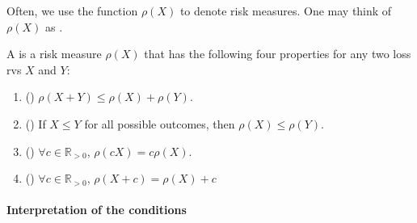 \documentclass[notoc,notitlepage]{tufte-book}
\begin{document}
Often, we use the function $\rho(X)$ to denote risk measures. One may think of $\rho(X)$ as .

\begin{defn}
\label{defn:coherent_risk_measure}
  A  is a risk measure $\rho(X)$ that has the following four properties for any two loss rvs $X$ and $Y$:
  \begin{enumerate}
    \item () $\rho(X + Y) \leq \rho(X) + \rho(Y)$.
    \item () If $X \leq Y$ for all possible outcomes, then $\rho(X) \leq \rho(Y)$.
    \item () $\forall c \in \mathbb{R}_{> 0}$, $\rho(cX) = c\rho(X)$.
    \item () $\forall c \in \mathbb{R}_{> 0}$, $\rho(X + c) = \rho(X) + c$
  \end{enumerate}
\end{defn}

\paragraph{Interpretation of the conditions}
\end{document}
